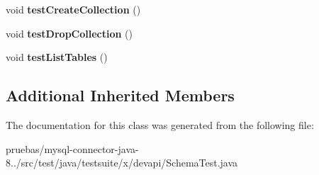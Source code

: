 \begin{DoxyCompactItemize}
\mbox{\label{classtestsuite_1_1x_1_1devapi_1_1_schema_test_a60251e23756f63fd154c5025c21481d3}} 
void {\bfseries test\+Create\+Collection} ()
\item 
\mbox{\label{classtestsuite_1_1x_1_1devapi_1_1_schema_test_a683009663590785741d7ef26101a3e3d}} 
void {\bfseries test\+Drop\+Collection} ()
\item 
\mbox{\label{classtestsuite_1_1x_1_1devapi_1_1_schema_test_aad95fb73c3cabcef7bca5ff99288d62f}} 
void {\bfseries test\+List\+Tables} ()
\end{DoxyCompactItemize}
\subsection*{Additional Inherited Members}


The documentation for this class was generated from the following file\+:\begin{DoxyCompactItemize}
\item 
pruebas/mysql-\/connector-\/java-\/8../src/test/java/testsuite/x/devapi/Schema\+Test.\+java\end{DoxyCompactItemize}
